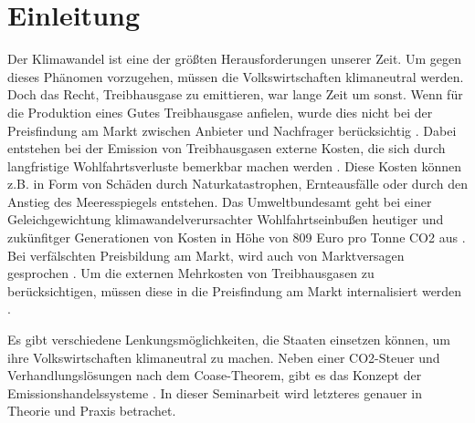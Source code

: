 \chapter{Einleitung}

Der Klimawandel ist eine der größten Herausforderungen unserer Zeit. Um gegen dieses Phänomen vorzugehen, müssen die Volkswirtschaften klimaneutral werden. 
Doch das Recht, Treibhausgase zu emittieren, war lange Zeit um sonst.
Wenn für die Produktion eines Gutes Treibhausgase anfielen, wurde dies nicht bei der Preisfindung am Markt zwischen Anbieter und Nachfrager berücksichtig \cite[S. 161]{hubert.2020}.
Dabei entstehen bei der Emission von Treibhausgasen externe Kosten, die sich durch langfristige Wohlfahrtsverluste bemerkbar machen werden \cite[S. 25]{rabe.2018} \cite{ub4.2023}. 
Diese Kosten können z.B. in Form von Schäden durch Naturkatastrophen, Ernteausfälle oder durch den Anstieg des Meeresspiegels entstehen. 
Das Umweltbundesamt geht bei einer Geleichgewichtung klimawandelverursachter Wohlfahrtseinbußen heutiger und zukünfitger Generationen von Kosten in Höhe von 809 Euro pro Tonne CO2 aus \cite{ub4.2023}.
Bei verfälschten Preisbildung am Markt, wird auch von Marktversagen gesprochen \cite[S. 268]{hubert.2019}.
Um die externen Mehrkosten von Treibhausgasen zu berücksichtigen, müssen diese in die Preisfindung am Markt internalisiert werden \cite[S. 161]{hubert.2020}.

Es gibt verschiedene Lenkungsmöglichkeiten, die Staaten einsetzen können, um ihre Volkswirtschaften klimaneutral zu machen.
Neben einer CO2-Steuer und Verhandlungslösungen nach dem Coase-Theorem, gibt es das Konzept der Emissionshandelssysteme \cite[S. 161]{hubert.2020}. 
In dieser Seminarbeit wird letzteres genauer in Theorie und Praxis betrachet.